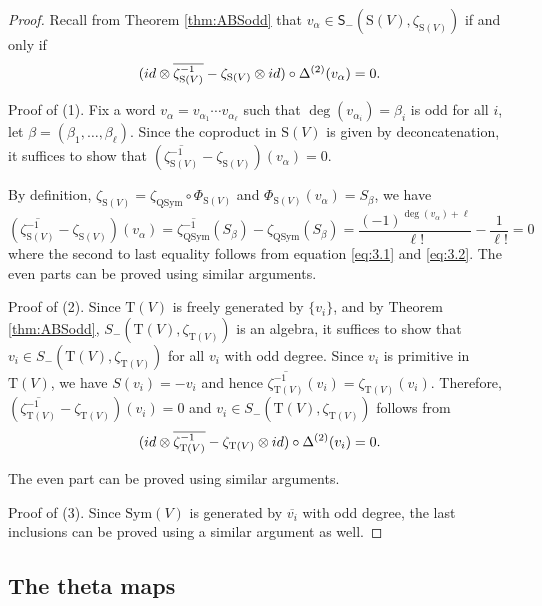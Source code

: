 \documentclass[12pt]{amsart}
\numberwithin{equation}{section}
\newcommand{\QSym}{\mathrm{QSym}}
\newcommand{\Sym}{\mathrm{Sym}}
\newcommand{\rmT}{\mathrm{T}}
\newcommand{\rmS}{\mathrm{S}}
\newcommand{\sfS}{\mathsf{S}}
\begin{document}
\begin{proof}
	Recall from Theorem \ref{thm:ABSodd} that $v_\alpha\in \sfS_-(\rmS(V),\zeta_{\rmS(V)})$ if and only if 
	$$({\rm id} \otimes \overline{\zeta_{\rmS(V)}^{-1}} - \zeta_{\rmS(V)} \otimes {\rm id})\circ \Delta^{(2)}(v_\alpha)=0.$$
	
	Proof of (1). Fix a word $v_\alpha=v_{\alpha_1}\cdots v_{\alpha_{\ell}}$ such that $\deg(v_{\alpha_i})=\beta_i$ is odd for all $i$, let $\beta=(\beta_1,\dots,\beta_\ell)$. Since the coproduct in $\rmS(V)$ is given by deconcatenation, it suffices to show that $\left(\overline{\zeta_{\rmS(V)}^{-1}} - \zeta_{\rmS(V)}\right)(v_\alpha)=0$.
	
	By definition, $\zeta_{\rmS(V)}=\zeta_\QSym\circ\Phi_{\rmS(V)}$ and $\Phi_{\rmS(V)}(v_\alpha)=S_\beta$, we have
	$$\left(\overline{\zeta_{\rmS(V)}^{-1}} - \zeta_{\rmS(V)}\right)(v_\alpha)=\overline{\zeta_\QSym^{-1}}(S_\beta)-\zeta_\QSym(S_\beta)=\frac{(-1)^{\deg(v_\alpha)+\ell}}{\ell!}-\frac{1}{\ell!}=0$$
	where the second to last equality follows from equation \ref{eq:3.1} and \ref{eq:3.2}. The even parts can be proved using similar arguments.
	
	Proof of (2). Since $\rmT(V)$ is freely generated by $\{v_i\}$, and by Theorem \ref{thm:ABSodd}, $S_-(\rmT(V),\zeta_{\rmT(V)})$ is an algebra, it suffices to show that $v_i\in S_-(\rmT(V),\zeta_{\rmT(V)})$ for all $v_i$ with odd degree. Since $v_i$ is primitive in $\rmT(V)$, we have $S(v_i)=-v_i$ and hence $\overline{\zeta_{\rmT(V)}^{-1}}(v_i)=\zeta_{\rmT(V)}(v_i)$. Therefore, $\left(\overline{\zeta_{\rmT(V)}^{-1}} - \zeta_{\rmT(V)}\right)(v_i)=0$ and $v_i\in S_-(\rmT(V),\zeta_{\rmT(V)})$ follows from
	$$({\rm id} \otimes \overline{\zeta_{\rmT(V)}^{-1}} - \zeta_{\rmT(V)} \otimes {\rm id})\circ \Delta^{(2)}(v_i)=0.$$
	
	The even part can be proved using similar arguments. 
	
	Proof of (3). Since $\Sym(V)$ is generated by $\overline{v_i}$ with odd degree, the last inclusions can be proved using a similar argument as well.
\end{proof}


\subsection{The theta maps}
\end{document}
